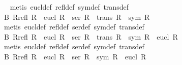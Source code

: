 \begin{isabellebody}
%
\isadelimproof
\ %
\endisadelimproof
%
\isatagproof
{}\isamarkupfalse%
\ {\isacharparenleft}metis\ eucl{\isacharunderscore}def\ refl{\isacharunderscore}def\ sym{\isacharunderscore}def\ trans{\isacharunderscore}def{\isacharparenright}%
\endisatagproof
{\isafoldproof}%
%
\isadelimproof
%
\endisadelimproof
%
\isamarkuptrue%
\isamarkupfalse%
\ B{}{\isacharcolon}\ {\isachardoublequoteopen}{\isasymforall}R{\isachardot}{\isacharparenleft}{\isacharparenleft}refl\ R{\isacharparenright}\ {\isasymand}\ {\isacharparenleft}eucl\ R{\isacharparenright}{\isacharparenright}\ {\isasymlongleftrightarrow}\ {\isacharparenleft}{\isacharparenleft}ser\ R{\isacharparenright}\ {\isasymand}\ {\isacharparenleft}trans\ R{\isacharparenright}\ {\isasymand}\ {\isacharparenleft}sym\ R{\isacharparenright}{\isacharparenright}{\isachardoublequoteclose}\isanewline
%
\isadelimproof
\ %
\endisadelimproof
%
\isatagproof
{}\isamarkupfalse%
\ {\isacharparenleft}metis\ eucl{\isacharunderscore}def\ refl{\isacharunderscore}def\ ser{\isacharunderscore}def\ sym{\isacharunderscore}def\ trans{\isacharunderscore}def{\isacharparenright}%
\endisatagproof
{\isafoldproof}%
%
\isadelimproof
%
\endisadelimproof
%
\isamarkuptrue%
\isamarkupfalse%
\ B{}{\isacharcolon}\ {\isachardoublequoteopen}{\isasymforall}R{\isachardot}{\isacharparenleft}{\isacharparenleft}refl\ R{\isacharparenright}\ {\isasymand}\ {\isacharparenleft}eucl\ R{\isacharparenright}{\isacharparenright}\ {\isasymlongleftrightarrow}\ {\isacharparenleft}{\isacharparenleft}ser\ R{\isacharparenright}\ {\isasymand}\ {\isacharparenleft}trans\ R{\isacharparenright}\ {\isasymand}\ {\isacharparenleft}sym\ R{\isacharparenright}\ {\isasymand}\ {\isacharparenleft}eucl\ R{\isacharparenright}{\isacharparenright}{\isachardoublequoteclose}\isanewline
%
\isadelimproof
\ %
\endisadelimproof
%
\isatagproof
{}\isamarkupfalse%
\ {\isacharparenleft}metis\ eucl{\isacharunderscore}def\ refl{\isacharunderscore}def\ ser{\isacharunderscore}def\ sym{\isacharunderscore}def\ trans{\isacharunderscore}def{\isacharparenright}%
\endisatagproof
{\isafoldproof}%
%
\isadelimproof
%
\endisadelimproof
%
\isamarkuptrue%
\isamarkupfalse%
\ B{}{\isacharcolon}\ {\isachardoublequoteopen}{\isasymforall}R{\isachardot}{\isacharparenleft}{\isacharparenleft}refl\ R{\isacharparenright}\ {\isasymand}\ {\isacharparenleft}eucl\ R{\isacharparenright}{\isacharparenright}\ {\isasymlongleftrightarrow}\ {\isacharparenleft}{\isacharparenleft}ser\ R{\isacharparenright}\ {\isasymand}\ {\isacharparenleft}sym\ R{\isacharparenright}\ {\isasymand}\ {\isacharparenleft}eucl\ R{\isacharparenright}{\isacharparenright}{\isachardoublequoteclose}\isanewline

\end{isabellebody}

